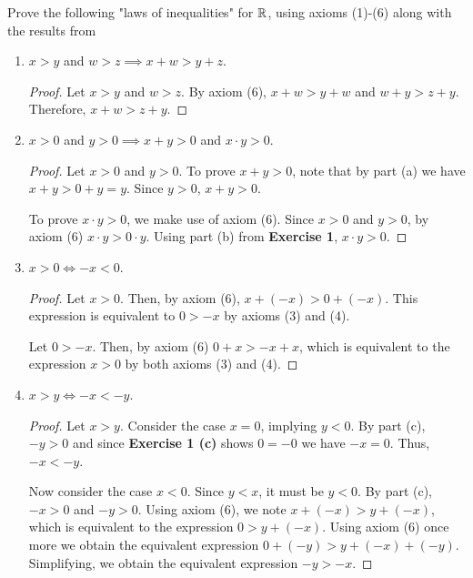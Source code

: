 \documentclass[12pt]{article}
\begin{document}
	 Prove the following "laws of inequalities" for $\mathbb{R}$, using axioms (1)-(6) along
	with the results from 
	\begin{enumerate}[label=(\alph*)]
		\item $x > y$ and $w > z \implies x + w > y + z.$
		\begin{proof}
			Let $x > y$ and $w > z$. By axiom (6), $x + w > y + w$ and $w + y > z + y$.
			Therefore, $x + w > z + y$.
		\end{proof}
		\item $x> 0$ and $y > 0 \implies x + y > 0$ and $x \cdot y > 0$.
		\begin{proof}
			Let $x > 0$ and $y > 0$. To prove $x + y > 0$, note that by part (a) we have $x + y > 0 + y = y$.
			Since $y > 0$, $x + y > 0$. 
			
			To prove $x \cdot y > 0$, we make use of axiom (6). Since $x > 0$ and $y > 0$, by axiom (6)
			$x \cdot y > 0 \cdot y$. Using part (b) from \textbf{Exercise 1},
			$x \cdot y > 0$.
		\end{proof}
		\item $x > 0 \iff -x < 0$.
		\begin{proof}
			Let $x > 0$. Then, by axiom (6), $x + (-x) > 0 + (-x)$. This expression is equivalent to
			$0 > -x$ by axioms (3) and (4).
			
			Let $0 > -x$. Then, by axiom (6) $0 + x > -x + x$, which is equivalent to the expression
			$x > 0$ by both axioms (3) and (4).
		\end{proof}
		\item $x > y \iff -x < -y$.
		\begin{proof}
			Let $x > y$. Consider the case $x = 0$, implying $y < 0$. By part (c), $-y > 0$ and 
			since \textbf{Exercise 1 (c)} shows $0 = -0$ we have $-x = 0$. Thus, $-x < -y$.
			
			Now consider the case $x < 0$. Since $y < x$, it must be $y < 0$. By part (c), $-x > 0$ 
			and $-y > 0$. Using axiom (6), we note $x + (-x) > y + (-x)$, which is equivalent 
			to the expression $0 > y + (-x)$. Using axiom (6) once more we obtain the 
			equivalent expression $0 + (-y) > y + (-x) + (-y)$. Simplifying, we obtain the 
			equivalent expression $-y > -x$. 
			

\end{proof}
\end{enumerate}
\end{document}
